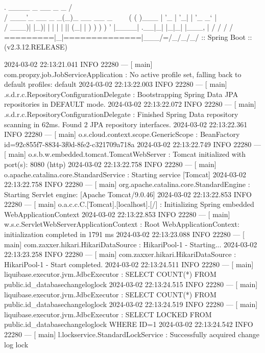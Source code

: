 
  .   ____          _            __ _ _
 /\\ / ___'_ __ _ _(_)_ __  __ _ \ \ \ \
( ( )\___ | '_ | '_| | '_ \/ _` | \ \ \ \
 \\/  ___)| |_)| | | | | || (_| |  ) ) ) )
  '  |____| .__|_| |_|_| |_\__, | / / / /
 =========|_|==============|___/=/_/_/_/
 :: Spring Boot ::       (v2.3.12.RELEASE)

2024-03-02 22:13:21.041  INFO 22280 --- [           main] com.propzy.job.JobServiceApplication     : No active profile set, falling back to default profiles: default
2024-03-02 22:13:22.003  INFO 22280 --- [           main] .s.d.r.c.RepositoryConfigurationDelegate : Bootstrapping Spring Data JPA repositories in DEFAULT mode.
2024-03-02 22:13:22.072  INFO 22280 --- [           main] .s.d.r.c.RepositoryConfigurationDelegate : Finished Spring Data repository scanning in 62ms. Found 2 JPA repository interfaces.
2024-03-02 22:13:22.361  INFO 22280 --- [           main] o.s.cloud.context.scope.GenericScope     : BeanFactory id=92c855f7-8834-3f0d-8fe2-c321709a718a
2024-03-02 22:13:22.749  INFO 22280 --- [           main] o.s.b.w.embedded.tomcat.TomcatWebServer  : Tomcat initialized with port(s): 8080 (http)
2024-03-02 22:13:22.758  INFO 22280 --- [           main] o.apache.catalina.core.StandardService   : Starting service [Tomcat]
2024-03-02 22:13:22.758  INFO 22280 --- [           main] org.apache.catalina.core.StandardEngine  : Starting Servlet engine: [Apache Tomcat/9.0.46]
2024-03-02 22:13:22.853  INFO 22280 --- [           main] o.a.c.c.C.[Tomcat].[localhost].[/]       : Initializing Spring embedded WebApplicationContext
2024-03-02 22:13:22.853  INFO 22280 --- [           main] w.s.c.ServletWebServerApplicationContext : Root WebApplicationContext: initialization completed in 1791 ms
2024-03-02 22:13:23.088  INFO 22280 --- [           main] com.zaxxer.hikari.HikariDataSource       : HikariPool-1 - Starting...
2024-03-02 22:13:23.258  INFO 22280 --- [           main] com.zaxxer.hikari.HikariDataSource       : HikariPool-1 - Start completed.
2024-03-02 22:13:24.511  INFO 22280 --- [           main] liquibase.executor.jvm.JdbcExecutor      : SELECT COUNT(*) FROM public.id_databasechangeloglock
2024-03-02 22:13:24.515  INFO 22280 --- [           main] liquibase.executor.jvm.JdbcExecutor      : SELECT COUNT(*) FROM public.id_databasechangeloglock
2024-03-02 22:13:24.519  INFO 22280 --- [           main] liquibase.executor.jvm.JdbcExecutor      : SELECT LOCKED FROM public.id_databasechangeloglock WHERE ID=1
2024-03-02 22:13:24.542  INFO 22280 --- [           main] l.lockservice.StandardLockService        : Successfully acquired change log lock
